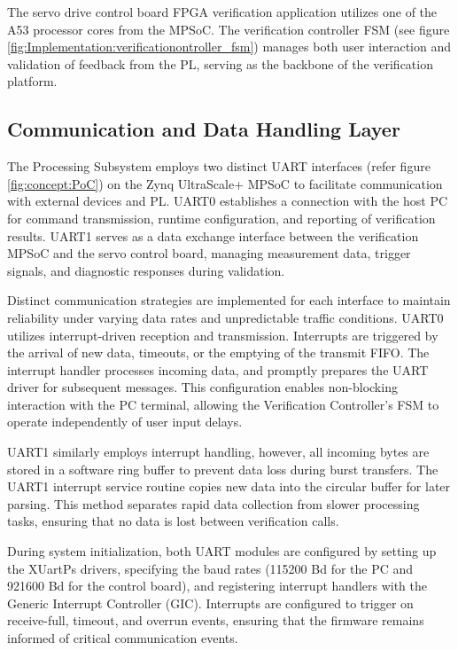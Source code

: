 The servo drive control board \acs{FPGA} verification application utilizes one of the A53 processor cores from the \acs{MPSoC}. The verification controller \acs{FSM} (see figure \ref{fig:Implementation:verificationontroller_fsm}) manages both user interaction and validation of feedback from the \acs{PL}, serving as the backbone of the verification platform.

\subsection{Communication and Data Handling Layer}
\label{sec:Implementation:Communication_and_DataHandling}

The Processing Subsystem employs two distinct \acs{UART} interfaces (refer figure \ref{fig:concept:PoC}) on the Zynq UltraScale+ \acs{MPSoC} to facilitate communication with external devices and \acs{PL}. UART0 establishes a connection with the host PC for command transmission, runtime configuration, and reporting of verification results. UART1 serves as a data exchange interface between the verification \acs{MPSoC} and the servo control board, managing measurement data, trigger signals, and diagnostic responses during validation.

Distinct communication strategies are implemented for each interface to maintain reliability under varying data rates and unpredictable traffic conditions. UART0 utilizes interrupt-driven reception and transmission. Interrupts are triggered by the arrival of new data, timeouts, or the emptying of the transmit \acs{FIFO}. The interrupt handler processes incoming data, and promptly prepares the \acs{UART} driver for subsequent messages. This configuration enables non-blocking interaction with the PC terminal, allowing the Verification Controller's \acs{FSM} to operate independently of user input delays.

UART1 similarly employs interrupt handling, however, all incoming bytes are stored in a software ring buffer to prevent data loss during burst transfers. The UART1 interrupt service routine copies new data into the circular buffer for later parsing. This method separates rapid data collection from slower processing tasks, ensuring that no data is lost between verification calls.

During system initialization, both \acs{UART} modules are configured by setting up the XUartPs drivers, specifying the baud rates (115200 Bd for the PC and 921600 Bd for the control board), and registering interrupt handlers with the Generic Interrupt Controller (GIC). Interrupts are configured to trigger on receive-full, timeout, and overrun events, ensuring that the firmware remains informed of critical communication events.

